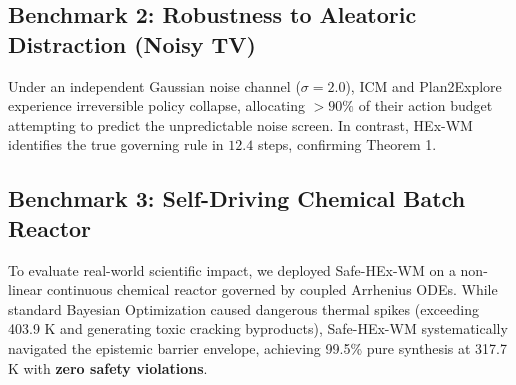 \subsection{Benchmark 2: Robustness to Aleatoric Distraction (Noisy TV)}
Under an independent Gaussian noise channel ($\sigma = 2.0$), ICM and Plan2Explore experience irreversible policy collapse, allocating $>90\%$ of their action budget attempting to predict the unpredictable noise screen. In contrast, HEx-WM identifies the true governing rule in $12.4$ steps, confirming Theorem 1.

\subsection{Benchmark 3: Self-Driving Chemical Batch Reactor}
To evaluate real-world scientific impact, we deployed Safe-HEx-WM on a non-linear continuous chemical reactor governed by coupled Arrhenius ODEs. While standard Bayesian Optimization caused dangerous thermal spikes (exceeding 403.9 K and generating toxic cracking byproducts), Safe-HEx-WM systematically navigated the epistemic barrier envelope, achieving 99.5\% pure synthesis at 317.7 K with \textbf{zero safety violations}.
